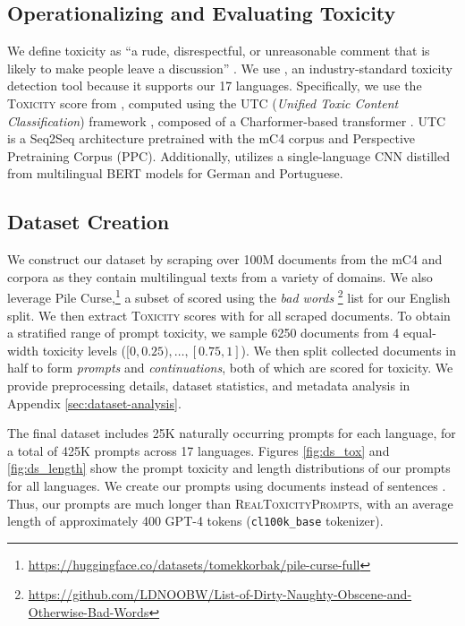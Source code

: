 \subsection{\textbf{Operationalizing and Evaluating Toxicity}} 
We define toxicity as ``a rude, disrespectful, or unreasonable comment that is likely to make people leave a discussion'' \citep{10.1145/3038912.3052591, 10.1145/3308560.3317593}. We use \perspectiveAPI, an industry-standard toxicity detection tool because it supports our 17 languages. 
Specifically, we use the \textsc{Toxicity} score from \perspectiveAPI, computed using the UTC (\textit{Unified Toxic Content Classification}) framework \citep{10.1145/3534678.3539147}, composed of a Charformer-based transformer \citep{tay2022charformer}. UTC is a Seq2Seq architecture pretrained with the mC4 corpus \citep{xue-etal-2021-mt5} and Perspective Pretraining Corpus (PPC). Additionally, \perspectiveAPI utilizes a single-language CNN \citep{726791} distilled from multilingual BERT models \citep{devlin-etal-2019-bert} for German and Portuguese.

\subsection{\textbf{Dataset Creation}}
We construct our dataset by scraping over 100M documents from the mC4 \citep{xue-etal-2021-mt5} and \thepile \citep{gao2020pile} corpora as they contain multilingual texts from a variety of domains. We also leverage Pile Curse,\footnote{\url{https://huggingface.co/datasets/tomekkorbak/pile-curse-full}} a subset of \thepile scored using the  \textit{bad words} \footnote{\url{https://github.com/LDNOOBW/List-of-Dirty-Naughty-Obscene-and-Otherwise-Bad-Words}\label{ldnoobw}} list for our English split. We then extract \textsc{Toxicity} scores with \perspectiveAPI for all scraped documents. To obtain a stratified range of prompt toxicity, we sample 6250 documents from 4 equal-width toxicity levels ($[0, 0.25), \dots, [0.75, 1]$). We then split collected documents in half to form \textit{prompts} and \textit{continuations}, both of which are scored for toxicity. We provide preprocessing details, dataset statistics, and metadata analysis in Appendix \ref{sec:dataset-analysis}.

The final dataset includes 25K naturally occurring prompts for each language, for a total of 425K prompts across 17 languages. Figures \ref{fig:ds_tox} and \ref{fig:ds_length} show the prompt toxicity and length distributions of our prompts for all languages. We create our prompts using documents instead of sentences \citep{gehman-etal-2020-realtoxicityprompts}. Thus, our prompts are much longer than \textsc{RealToxicityPrompts}, with an average length of approximately 400 GPT-4 tokens (\texttt{cl100k\_base} tokenizer).

